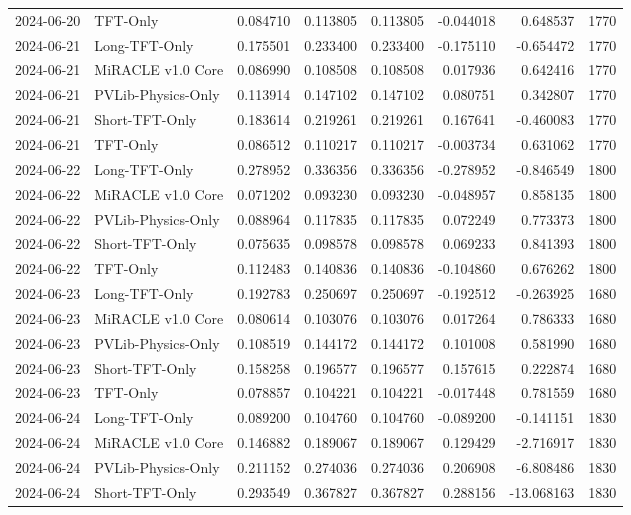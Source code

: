 \begin{tabular}{llrrrrrr}
2024-06-20 & TFT-Only & 0.084710 & 0.113805 & 0.113805 & -0.044018 & 0.648537 & 1770 \\
2024-06-21 & Long-TFT-Only & 0.175501 & 0.233400 & 0.233400 & -0.175110 & -0.654472 & 1770 \\
2024-06-21 & MiRACLE v1.0 Core & 0.086990 & 0.108508 & 0.108508 & 0.017936 & 0.642416 & 1770 \\
2024-06-21 & PVLib-Physics-Only & 0.113914 & 0.147102 & 0.147102 & 0.080751 & 0.342807 & 1770 \\
2024-06-21 & Short-TFT-Only & 0.183614 & 0.219261 & 0.219261 & 0.167641 & -0.460083 & 1770 \\
2024-06-21 & TFT-Only & 0.086512 & 0.110217 & 0.110217 & -0.003734 & 0.631062 & 1770 \\
2024-06-22 & Long-TFT-Only & 0.278952 & 0.336356 & 0.336356 & -0.278952 & -0.846549 & 1800 \\
2024-06-22 & MiRACLE v1.0 Core & 0.071202 & 0.093230 & 0.093230 & -0.048957 & 0.858135 & 1800 \\
2024-06-22 & PVLib-Physics-Only & 0.088964 & 0.117835 & 0.117835 & 0.072249 & 0.773373 & 1800 \\
2024-06-22 & Short-TFT-Only & 0.075635 & 0.098578 & 0.098578 & 0.069233 & 0.841393 & 1800 \\
2024-06-22 & TFT-Only & 0.112483 & 0.140836 & 0.140836 & -0.104860 & 0.676262 & 1800 \\
2024-06-23 & Long-TFT-Only & 0.192783 & 0.250697 & 0.250697 & -0.192512 & -0.263925 & 1680 \\
2024-06-23 & MiRACLE v1.0 Core & 0.080614 & 0.103076 & 0.103076 & 0.017264 & 0.786333 & 1680 \\
2024-06-23 & PVLib-Physics-Only & 0.108519 & 0.144172 & 0.144172 & 0.101008 & 0.581990 & 1680 \\
2024-06-23 & Short-TFT-Only & 0.158258 & 0.196577 & 0.196577 & 0.157615 & 0.222874 & 1680 \\
2024-06-23 & TFT-Only & 0.078857 & 0.104221 & 0.104221 & -0.017448 & 0.781559 & 1680 \\
2024-06-24 & Long-TFT-Only & 0.089200 & 0.104760 & 0.104760 & -0.089200 & -0.141151 & 1830 \\
2024-06-24 & MiRACLE v1.0 Core & 0.146882 & 0.189067 & 0.189067 & 0.129429 & -2.716917 & 1830 \\
2024-06-24 & PVLib-Physics-Only & 0.211152 & 0.274036 & 0.274036 & 0.206908 & -6.808486 & 1830 \\
2024-06-24 & Short-TFT-Only & 0.293549 & 0.367827 & 0.367827 & 0.288156 & -13.068163 & 1830 \\

\end{tabular}
